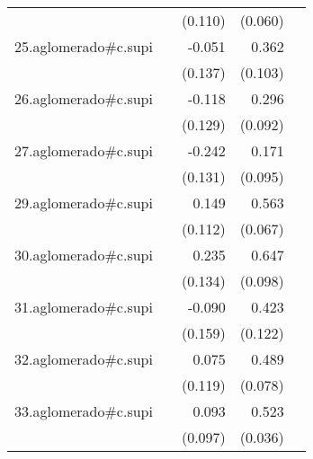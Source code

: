 {\begin{longtable}{l*{4}{D{.}{.}{-1}}}
            &                     &     (0.110)         &     (0.060)         &                     \\
\addlinespace
25.aglomerado#c.supi&                     &      -0.051         &       0.362\sym{***}&                     \\
            &                     &     (0.137)         &     (0.103)         &                     \\
\addlinespace
26.aglomerado#c.supi&                     &      -0.118         &       0.296\sym{**} &                     \\
            &                     &     (0.129)         &     (0.092)         &                     \\
\addlinespace
27.aglomerado#c.supi&                     &      -0.242         &       0.171         &                     \\
            &                     &     (0.131)         &     (0.095)         &                     \\
\addlinespace
29.aglomerado#c.supi&                     &       0.149         &       0.563\sym{***}&                     \\
            &                     &     (0.112)         &     (0.067)         &                     \\
\addlinespace
30.aglomerado#c.supi&                     &       0.235         &       0.647\sym{***}&                     \\
            &                     &     (0.134)         &     (0.098)         &                     \\
\addlinespace
31.aglomerado#c.supi&                     &      -0.090         &       0.423\sym{***}&                     \\
            &                     &     (0.159)         &     (0.122)         &                     \\
\addlinespace
32.aglomerado#c.supi&                     &       0.075         &       0.489\sym{***}&                     \\
            &                     &     (0.119)         &     (0.078)         &                     \\
\addlinespace
33.aglomerado#c.supi&                     &       0.093         &       0.523\sym{***}&                     \\
            &                     &     (0.097)         &     (0.036)         &                     \\

\end{longtable}}
